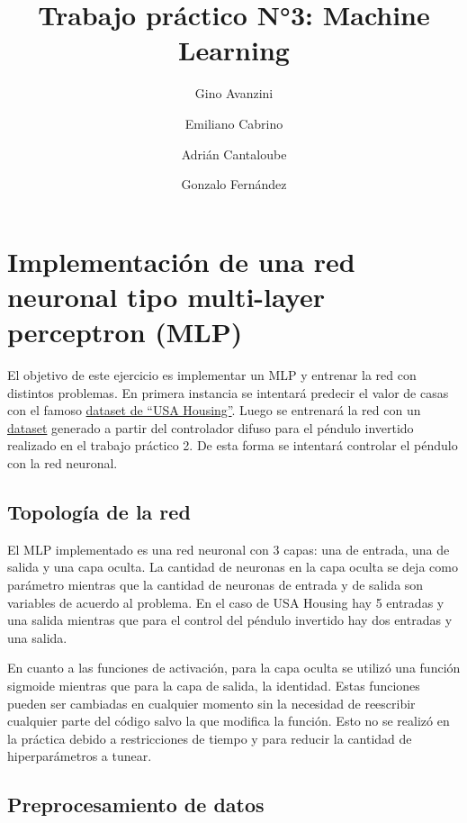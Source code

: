 \documentclass[
]{article}
\title{Trabajo práctico N°3: Machine Learning}
\author{Gino Avanzini \and Emiliano Cabrino \and Adrián Cantaloube \and Gonzalo Fernández}
\date{}
\begin{document}
\maketitle

\hypertarget{implementaciuxf3n-de-una-red-neuronal-tipo-multi-layer-perceptron-mlp}{%
\section{Implementación de una red neuronal tipo multi-layer perceptron
(MLP)}\label{implementaciuxf3n-de-una-red-neuronal-tipo-multi-layer-perceptron-mlp}}

El objetivo de este ejercicio es implementar un MLP y entrenar la red
con distintos problemas. En primera instancia se intentará predecir el
valor de casas con el famoso
\href{../TP_3/datasets/USA_Housing.csv}{dataset de ``USA Housing''}.
Luego se entrenará la red con un
\href{../TP_3/datasets/pendulum.csv}{dataset} generado a partir del
controlador difuso para el péndulo invertido realizado en el trabajo
práctico 2. De esta forma se intentará controlar el péndulo con la red
neuronal.

\hypertarget{topologuxeda-de-la-red}{%
\subsection{Topología de la red}\label{topologuxeda-de-la-red}}

El MLP implementado es una red neuronal con 3 capas: una de entrada, una
de salida y una capa oculta. La cantidad de neuronas en la capa oculta
se deja como parámetro mientras que la cantidad de neuronas de entrada y
de salida son variables de acuerdo al problema. En el caso de USA
Housing hay 5 entradas y una salida mientras que para el control del
péndulo invertido hay dos entradas y una salida.

En cuanto a las funciones de activación, para la capa oculta se utilizó
una función sigmoide mientras que para la capa de salida, la identidad.
Estas funciones pueden ser cambiadas en cualquier momento sin la
necesidad de reescribir cualquier parte del código salvo la que modifica
la función. Esto no se realizó en la práctica debido a restricciones de
tiempo y para reducir la cantidad de hiperparámetros a tunear.

\hypertarget{preprocesamiento-de-datos}{%
\subsection{Preprocesamiento de datos}\label{preprocesamiento-de-datos}}
\end{document}
